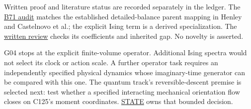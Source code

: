 \documentclass[11pt,a4paper]{article}
\begin{document}
Written proof and literature status are recorded separately in the
ledger. The \href{../references/batches/B71.md}{B71 audit} matches the
established detailed-balance parent mapping in Henley and Castelnovo et
al.; the explicit Ising term is a derived specialization. The
\href{../reviews/ising-hermitian-B71.md}{written review} checks its
coefficients and inherited gap. No novelty is asserted.

G04 stops at the explicit finite-volume operator. Additional Ising
spectra would not select its clock or action scale. A further operator
task requires an independently specified physical dynamics whose
imaginary-time generator can be compared with this one. The quantum
track's reversible-descent premise is selected next: test whether a
specified interacting mechanical orientation flow closes on C125's
moment coordinates. \href{../research/STATE.md}{STATE} owns that bounded
decision.
\end{document}
